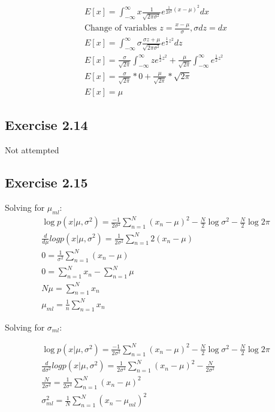 \begin{gather}
  E[x] = \int_{-\infty}^{\infty} x \frac{1}{\sqrt{2\pi \sigma^2}} e^{\frac{1}{2\sigma^2}(x-\mu)^2}dx \\
  \text{Change of variables } z = \frac{x-\mu}{\sigma}, \sigma dz = dx \\
  E[x] = \int_{-\infty}^{\infty}  \sigma \frac{\sigma z + \mu}{\sqrt{2\pi \sigma^2}} e^{\frac{1}{2}z^2}dz \\
  E[x] = \frac{\sigma}{\sqrt{2\pi}} \int_{-\infty}^{\infty}   z e^{\frac{1}{2}z^2}  + \frac{\mu}{\sqrt{2\pi}} \int_{-\infty}^{\infty} e^{\frac{1}{2}z^2} \\
  E[x] = \frac{\sigma}{\sqrt{2\pi}} * 0 +  \frac{\mu}{\sqrt{2\pi}} * \sqrt{2\pi} \\
  E[x] = \mu
\end{gather}

\subsection{Exercise 2.14}
Not attempted
\subsection{Exercise 2.15}
Solving for $\mu_{ml}$: 
\begin{gather}
  \log p(x|\mu,\sigma^2) = \frac{-1}{2\sigma^2}\sum_{n=1}^{N}(x_n - \mu)^2 - \frac{N}{2}\log \sigma^2 - \frac{N}{2}\log 2\pi \\
  \frac{d}{d\mu} log p(x|\mu,\sigma^2) = \frac{1}{2\sigma^2}\sum_{n=1}^{N}2(x_n - \mu) \\
  0 = \frac{1}{\sigma^2}\sum_{n=1}^{N}(x_n - \mu) \\ 
  0 = \sum_{n=1}^{N}x_n - \sum_{n=1}^{N}\mu \\
  N\mu = \sum_{n=1}^{N}x_n \\ 
  \mu_{ml} = \frac{1}{n} \sum_{n=1}^{N}x_n
\end{gather}

Solving for $\sigma_{ml}$:

\begin{gather}
  \log p(x|\mu,\sigma^2) = \frac{-1}{2\sigma^2}\sum_{n=1}^{N}(x_n - \mu)^2 - \frac{N}{2}\log \sigma^2 - \frac{N}{2}\log 2\pi \\
  \frac{d}{d\sigma^2} log p(x|\mu,\sigma^2) = \frac{1}{2\sigma^4}\sum_{n=1}^{N}(x_n - \mu)^2 - \frac{N}{2\sigma^2} \\
  \frac{N}{2\sigma^2} = \frac{1}{2\sigma^4}\sum_{n=1}^{N}(x_n - \mu)^2 \\
  \sigma_{ml}^2 =  \frac{1}{N}\sum_{n=1}^{N}(x_n - \mu_{ml})^2
\end{gather}


